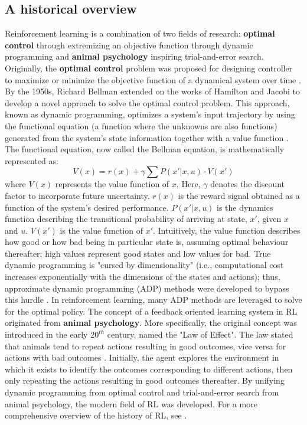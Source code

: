 \subsection{A historical overview}
Reinforcement learning is a combination of two fields of research: \textbf{optimal control} through extremizing an objective function through dynamic programming and \textbf{animal psychology} inspiring trial-and-error search. Originally, the \textbf{optimal control} problem was proposed for designing controller to maximize or minimize the objective function of a dynamical system over time \cite{mpc}.  By the 1950s, Richard Bellman extended on the works of Hamilton and Jacobi to develop a novel approach to solve the optimal control problem.  This approach, known as dynamic programming, optimizes a system's input trajectory by using the functional equation (a function where the unknowns are also functions) generated from the system's state information together with a value function \cite{bellman1}.  The functional equation, now called the Bellman equation, is mathematically represented as:
\begin{equation}
    V(x) = r(x) + \gamma \sum P(x' | x, u) \cdot V(x')
    \label{eq:bellman_eq}
\end{equation}
where $V(x)$ represents the value function of $x$. Here, $\gamma$ denotes the discount factor to incorporate future uncertainty. $r(x)$ is the reward signal obtained as a function of the system's desired performance. $P(x'|x, u)$ is the dynamics function describing the transitional probability of arriving at state, $x'$, given $x$ and $u$. $V(x')$ is the value function of $x'$. Intuitively, the value function describes how good or how bad being in particular state is, assuming optimal behaviour thereafter; high values represent good states and low values for bad.  True dynamic programming is "cursed by dimensionality" (i.e., computational cost increases exponentially with the dimensions of the states and actions); thus, approximate dynamic programming (ADP) methods were developed to bypass this hurdle \cite{adp}.  In reinforcement learning, many ADP methods are leveraged to solve for the optimal policy. The concept of a feedback oriented learning system in RL originated from \textbf{animal psychology}. More specifically, the original concept was introduced in the early $20^{th}$ century, named the "Law of Effect". The law stated that animals tend to repeat actions resulting in good outcomes, vice versa for actions with bad outcomes \cite{thorndike}. Initially, the agent explores the environment in which it exists to identify the outcomes corresponding to different actions, then only repeating the actions resulting in good outcomes thereafter. By unifying dynamic programming from optimal control and trial-and-error search from animal psychology, the modern field of RL was developed. For a more comprehensive overview of the history of RL, see \cite{sutton}.

